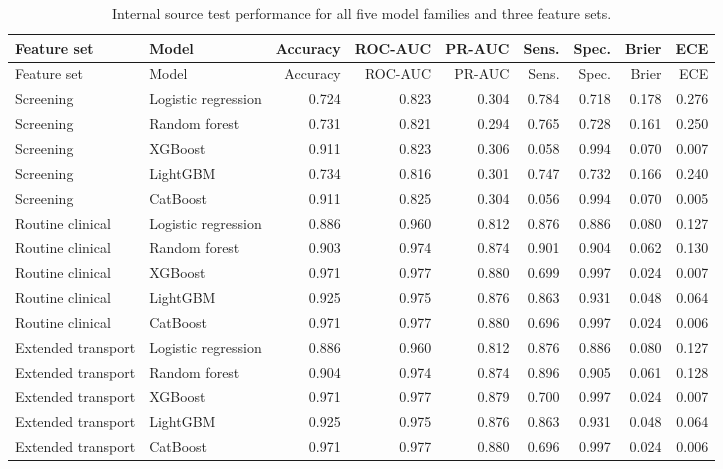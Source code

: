 \documentclass[11pt]{article}
\begin{document}
\begin{landscape}
\begin{longtable}{llrrrrrrr}
\caption{Internal source test performance for all five model families and three feature sets.}
\label{tab:internal}\\
\toprule
Feature set & Model & Accuracy & ROC-AUC & PR-AUC & Sens. & Spec. & Brier & ECE \\
\midrule
\endfirsthead
\toprule
Feature set & Model & Accuracy & ROC-AUC & PR-AUC & Sens. & Spec. & Brier & ECE \\
\midrule
\endhead
Screening & Logistic regression & 0.724 & 0.823 & 0.304 & 0.784 & 0.718 & 0.178 & 0.276 \\
Screening & Random forest & 0.731 & 0.821 & 0.294 & 0.765 & 0.728 & 0.161 & 0.250 \\
Screening & XGBoost & 0.911 & 0.823 & 0.306 & 0.058 & 0.994 & 0.070 & 0.007 \\
Screening & LightGBM & 0.734 & 0.816 & 0.301 & 0.747 & 0.732 & 0.166 & 0.240 \\
Screening & CatBoost & 0.911 & 0.825 & 0.304 & 0.056 & 0.994 & 0.070 & 0.005 \\
Routine clinical & Logistic regression & 0.886 & 0.960 & 0.812 & 0.876 & 0.886 & 0.080 & 0.127 \\
Routine clinical & Random forest & 0.903 & 0.974 & 0.874 & 0.901 & 0.904 & 0.062 & 0.130 \\
Routine clinical & XGBoost & 0.971 & 0.977 & 0.880 & 0.699 & 0.997 & 0.024 & 0.007 \\
Routine clinical & LightGBM & 0.925 & 0.975 & 0.876 & 0.863 & 0.931 & 0.048 & 0.064 \\
Routine clinical & CatBoost & 0.971 & 0.977 & 0.880 & 0.696 & 0.997 & 0.024 & 0.006 \\
Extended transport & Logistic regression & 0.886 & 0.960 & 0.812 & 0.876 & 0.886 & 0.080 & 0.127 \\
Extended transport & Random forest & 0.904 & 0.974 & 0.874 & 0.896 & 0.905 & 0.061 & 0.128 \\
Extended transport & XGBoost & 0.971 & 0.977 & 0.879 & 0.700 & 0.997 & 0.024 & 0.007 \\
Extended transport & LightGBM & 0.925 & 0.975 & 0.876 & 0.863 & 0.931 & 0.048 & 0.064 \\
Extended transport & CatBoost & 0.971 & 0.977 & 0.880 & 0.696 & 0.997 & 0.024 & 0.006 \\
\bottomrule
\end{longtable}
\end{landscape}
\end{document}
